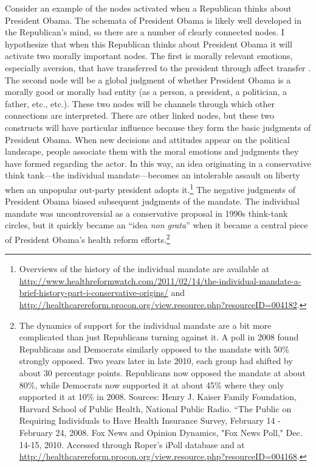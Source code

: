 Consider an example of the nodes activated when a Republican thinks about President Obama. The schemata of President Obama is likely well developed in the Republican's mind, so there are a number of clearly connected nodes. I hypothesize that when this Republican thinks about President Obama it will activate two morally important nodes. The first is morally relevant emotions, especially aversion, that have transferred to the president through affect transfer \cite{LodgeTaber2013}. The second node will be a global judgment of whether President Obama is a morally good or morally bad entity (as a person, a president, a politician, a father, etc., etc.). These two nodes will be channels through which other connections are interpreted. There are other linked nodes, but these two constructs will have particular influence because they form the basic judgments of President Obama. When new decisions and attitudes appear on the political landscape, people associate them with the moral emotions and judgments they have formed regarding the actor. In this way, an idea originating in a conservative think tank---the individual mandate---becomes an intolerable assault on liberty when an unpopular out-party president adopts it.\footnote{Overviews of the history of the individual mandate are available at \url{http://www.healthreformwatch.com/2011/02/14/the-individual-mandate-a-brief-history-part-i-conservative-origins/} and \url{http://healthcarereform.procon.org/view.resource.php?resourceID=004182}.} The negative judgments of President Obama biased subsequent judgments of the mandate. The individual mandate was uncontroversial as a conservative proposal in 1990s think-tank circles, but it quickly became an ``idea \emph{non grata}'' when it became a central piece of President Obama's health reform efforts.\footnote{The dynamics of support for the individual mandate are a bit more complicated than just Republicans turning against it. A poll in 2008 found Republicans and Democrats similarly opposed to the mandate with 50\% strongly opposed. Two years later in late 2010, each group had shifted by about 30 percentage points. Republicans now opposed the mandate at about 80\%, while Democrats now supported it at about 45\% where they only supported it at 10\% in 2008. Sources: Henry J. Kaiser Family Foundation, Harvard School of Public Health, National Public Radio. ``The Public on Requiring Individuals to Have Health Insurance Survey, February 14 - February 24, 2008. Fox News and Opinion Dynamics, "Fox News Poll," Dec. 14-15, 2010. Accessed through Roper's iPoll database and at \url{http://healthcarereform.procon.org/view.resource.php?resourceID=004168}.}

